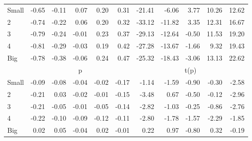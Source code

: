 \begin{table}[!ht]
\begin{tabular}{lrrrrrrrrrr}
    \\
      \cmidrule(r){2-6} \cmidrule(r){7-11}

    Small   & -0.65  & -0.11  & 0.07  & 0.20  & 0.31  & -21.41  & -6.06  & 3.77  & 10.26  & 12.62  \\
         2  & -0.74  & -0.22  & 0.06  & 0.20  & 0.32  & -33.12  & -11.82  & 3.35  & 12.31  & 16.67  \\
         3  & -0.79  & -0.24  & -0.01  & 0.23  & 0.37  & -29.13  & -12.64  & -0.50  & 11.53  & 19.20  \\
         4  & -0.81  & -0.29  & -0.03  & 0.19  & 0.42  & -27.28  & -13.67  & -1.66  & 9.32  & 19.43  \\
    Big     & -0.78  & -0.38  & -0.06  & 0.24  & 0.47  & -25.32  & -18.43  & -3.06  & 13.13  & 22.62  \\

  
    
      & \multicolumn{5}{c}{p} & \multicolumn{5}{c}{t(p)}
    
    \\
      \cmidrule(r){2-6} \cmidrule(r){7-11}

    Small   & -0.09  & -0.08  & -0.04  & -0.02  & -0.17  & -1.14  & -1.59  & -0.90  & -0.30  & -2.58  \\
         2  & -0.21  & 0.03  & -0.02  & -0.01  & -0.15  & -3.48  & 0.67  & -0.50  & -0.12  & -2.96  \\
         3  & -0.21  & -0.05  & -0.01  & -0.05  & -0.14  & -2.82  & -1.03  & -0.25  & -0.86  & -2.76  \\
         4  & -0.22  & -0.10  & -0.09  & -0.12  & -0.11  & -2.80  & -1.78  & -1.57  & -2.29  & -1.85  \\
    Big     & 0.02  & 0.05  & -0.04  & 0.02  & -0.01  & 0.22  & 0.97  & -0.80  & 0.32  & -0.19  \\

  

  \bottomrule
\end{tabular}
\label{tbl:25_Size_Prior_B2016}
\end{table}